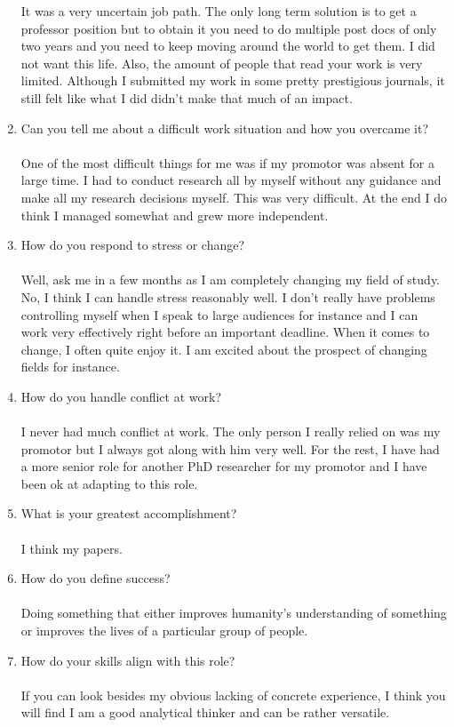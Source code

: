 \documentclass[12pt,a4paper,twoside]{article}
\begin{document}
\begin{enumerate}
		It was a very uncertain job path. The only long term solution is to get a professor position but to obtain it you need to do multiple post docs of only two years and you need to keep moving around the world to get them. I did not want this life. Also, the amount of people that read your work is very limited. Although I submitted my work in some pretty prestigious journals, it still felt like what I did didn't make that much of an impact.
		\item Can you tell me about a difficult work situation and how you overcame it?\\\\
		One of the most difficult things for me was if my promotor was absent for a large time. I had to conduct research all by myself without any guidance and make all my research decisions myself. This was very difficult. At the end I do think I managed somewhat and grew more independent.
		\item How do you respond to stress or change?\\\\
		Well, ask me in a few months as I am completely changing my field of study. No, I think I can handle stress reasonably well. I don't really have problems controlling myself when I speak to large audiences for instance and I can work very effectively right before an important deadline. When it comes to change, I often quite enjoy it. I am excited about the prospect of changing fields for instance.
		\item How do you handle conflict at work?\\\\
		I never had much conflict at work. The only person I really relied on was my promotor but I always got along with him very well. For the rest, I have had a more senior role for another PhD researcher for my promotor and I have been ok at adapting to this role.
		\item What is your greatest accomplishment?\\\\
		I think my papers.
		\item How do you define success?\\\\
		Doing something that either improves humanity's understanding of something or improves the lives of a particular group of people.
		\item How do your skills align with this role?\\\\
		If you can look besides my obvious lacking of concrete experience, I think you will find I am a good analytical thinker and can be rather versatile.

\end{enumerate}
\end{document}
